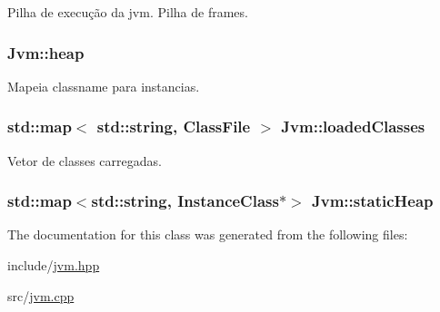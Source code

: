 Pilha de execução da jvm. Pilha de frames. 

\hypertarget{classJvm_ac0054a4d92e17e2a3ad01f9fe32bb096}{
\subsubsection[{heap}]{\setlength{\rightskip}{0pt plus 5cm}Jvm\+::heap}}\label{classJvm_ac0054a4d92e17e2a3ad01f9fe32bb096}


Mapeia classname para instancias. 

\hypertarget{classJvm_ac74fb0e170f232ddc32244a1ce7746b7}{
\subsubsection[{loaded\+Classes}]{\setlength{\rightskip}{0pt plus 5cm}std\+::map$<$ std\+::string, {\bf Class\+File} $>$ Jvm\+::loaded\+Classes}}\label{classJvm_ac74fb0e170f232ddc32244a1ce7746b7}


Vetor de classes carregadas. 

\hypertarget{classJvm_a8852d50533c03dabd4320c27e92d4f1b}{
\subsubsection[{static\+Heap}]{\setlength{\rightskip}{0pt plus 5cm}std\+::map$<$std\+::string, {\bf Instance\+Class}$\ast$$>$ Jvm\+::static\+Heap}}\label{classJvm_a8852d50533c03dabd4320c27e92d4f1b}


The documentation for this class was generated from the following files\+:\begin{DoxyCompactItemize}
\item 
include/\hyperlink{jvm_8hpp}{jvm.\+hpp}\item 
src/\hyperlink{jvm_8cpp}{jvm.\+cpp}\end{DoxyCompactItemize}
